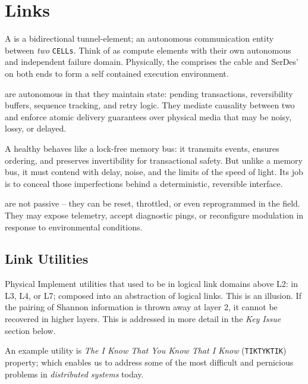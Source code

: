 \documentclass[../../../OAE-SPEC-MAIN.tex]{subfiles}
\begin{document}
\section{Links}

A \LINK is a bidirectional tunnel-element; an autonomous communication entity between  \emph{two} \texttt{CELLs}. Think of  \LINKs as compute elements with their own autonomous and independent failure domain. Physically, the \LINK comprises the cable and SerDes' on both ends to form a self contained execution environment.

\LINKs are autonomous in that they maintain state: pending transactions, reversibility buffers, sequence tracking, and retry logic. They mediate causality between two \CELLs and enforce atomic delivery guarantees over physical media that may be noisy, lossy, or delayed.

A healthy \LINK behaves like a lock-free memory bus: it transmits events, ensures ordering, and preserves invertibility for transactional safety. But unlike a memory bus, it must contend with delay, noise, and the limits of the speed of light. Its job is to conceal those imperfections behind a deterministic, reversible interface.

\LINKs are not passive -- they can be reset, throttled, or even reprogrammed in the field. They may expose telemetry, accept diagnostic pings, or reconfigure modulation in response to environmental conditions.

\subsection{Link Utilities}

Physical \LINKs Implement utilities that used to be in logical link domains above L2: in  L3, L4, or L7;  composed into an abstraction of logical links. This is an illusion. If the pairing of Shannon information is thrown away at layer 2, it cannot be recovered in higher layers. This is addressed in more detail in the \emph{Key Issue} section below.

An example \LINK utility is \emph{The I Know That You Know That I Know} (\texttt{TIK\hspace{1pt}TYK\hspace{1pt}TIK}) property; which  enables us to address some of the most difficult and pernicious problems in \emph{distributed systems} today. 
\end{document}
